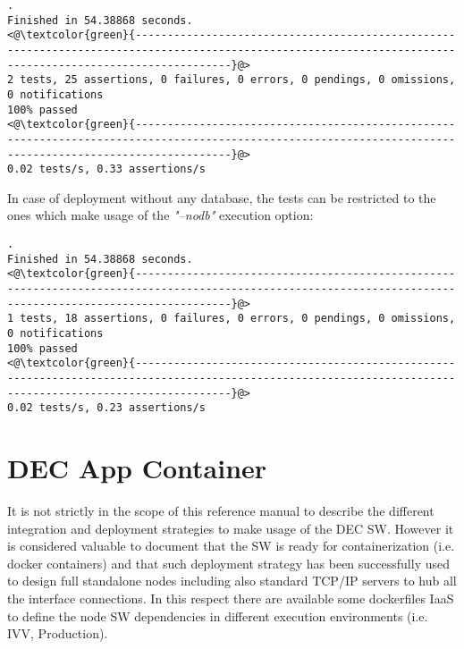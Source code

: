 \documentclass[dec_sum_main.tex]{subfiles}
\begin{document}
 \newline

\begin{lstlisting}
.
Finished in 54.38868 seconds.
<@\textcolor{green}{-----------------------------------------------------------------------------------------------------------------------------------------------------------}@>
2 tests, 25 assertions, 0 failures, 0 errors, 0 pendings, 0 omissions, 0 notifications
100% passed
<@\textcolor{green}{-----------------------------------------------------------------------------------------------------------------------------------------------------------}@>
0.02 tests/s, 0.33 assertions/s 
\end{lstlisting}

\noindent
\newline
In case of deployment without any database, the tests can be restricted to the ones which make usage of the \textit{"--nodb"} execution option:

 \newline

\begin{lstlisting}
.
Finished in 54.38868 seconds.
<@\textcolor{green}{-----------------------------------------------------------------------------------------------------------------------------------------------------------}@>
1 tests, 18 assertions, 0 failures, 0 errors, 0 pendings, 0 omissions, 0 notifications
100% passed
<@\textcolor{green}{-----------------------------------------------------------------------------------------------------------------------------------------------------------}@>
0.02 tests/s, 0.23 assertions/s
\end{lstlisting}

\section{DEC App Container}
It is not strictly in the scope of this reference manual to describe the different integration and deployment strategies to make usage of the DEC SW. However it is considered valuable to document that the SW is ready for containerization (i.e. docker containers) and that such deployment strategy has been successfully used to design full standalone nodes including also standard TCP/IP servers to hub all the interface connections. In this respect there are available some dockerfiles IaaS to define the node SW dependencies in different execution environments (i.e. IVV, Production).
\end{document}
